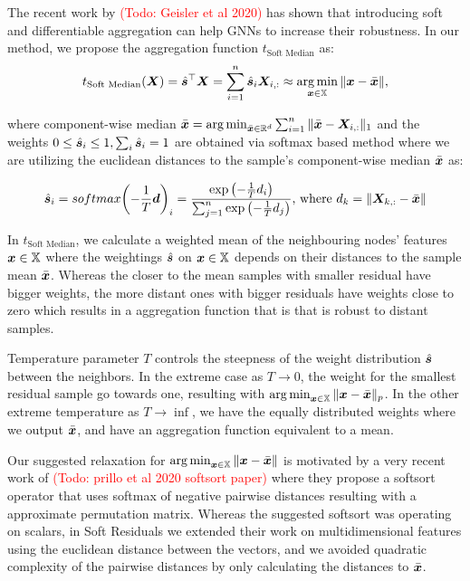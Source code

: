\documentclass{article} %
\newcommand{\features}{\mX}
\newcommand{\featset}{\sX}
\newcommand{\softout}{\vs}
\newcommand{\todo}[1]{\textcolor{red}{(Todo: #1)}}
\begin{document}
The recent work by \todo{Geisler et al 2020} has shown that introducing soft and differentiable aggregation can help GNNs to increase their robustness. In our method, we propose the aggregation function \(t_{\text{Soft Median}}\) as: 
\begin{equation}\label{eq:softmedian}
    t_{\text{Soft Median}}(\features) = \hat{\softout}^\top\features = \sum_{i=1}^n \hat{\softout}_i \features_{i,:} \approx \argmin_{\vx \in \featset} \| \vx - \bar{\vx} \|,  
\end{equation}

where component-wise median \(\bar{\vx} = \argmin_{\bar{\vx} \in \R^d} \sum_{i=1}^n \|\bar{\vx} - \features_{i,:}\|_1 \) and the weights \(0 \leq \hat{\softout}_i \leq 1, \sum_i \hat{\softout}_i = 1\) are obtained via softmax based method where we are utilizing the euclidean distances to the sample's component-wise median $\bar{{\bm{x}}}$ as:

\begin{equation}\label{eq:softmaxdist}
    \hat{\softout}_i
    = softmax{\left(-\frac{1}{T} \vd \right )}_i = \frac{\exp{\left(-\frac{1}{T} \evd_i \right )}}{\sum_{j=1 }^n \exp{\left (-\frac{1}{T} \evd_j \right )}} \text{,~where}~\evd_k = \|\features_{k,:} - \bar{\vx}\|
\end{equation}


 In \(t_{\text{Soft Median}}\), we calculate a weighted mean of the neighbouring nodes' features $\vx \in \featset$ where the weightings $\hat{\softout}$ on $\vx \in \featset$  depends on their distances to the sample mean $\bar{{\bm{x}}}$. Whereas the closer to the mean samples with smaller residual have bigger weights, the more distant ones with bigger residuals have weights close to zero which results in a aggregation function that is that is robust to distant samples.
 
 Temperature parameter $T$ controls the steepness of the weight distribution $\hat{\softout}$ between the neighbors. In the extreme case as $T\to0$, the weight for the smallest residual sample go towards one, resulting with $\argmin_{\vx \in \featset} \| \vx - \bar{\vx} \|_p$. In the other extreme temperature as $T\to\inf$, we have the equally distributed weights where we output $\bar{{\bm{x}}}$, and have an aggregation function equivalent to a mean. 
 
 Our suggested relaxation for $\argmin_{\vx \in \featset} \| \vx - \bar{\vx} \|$ is motivated by a very recent work of \todo{prillo et al 2020 softsort paper} where they propose a softsort operator that uses softmax of negative pairwise distances resulting with a approximate permutation matrix. Whereas the suggested softsort was operating on scalars, in Soft Residuals we extended their work on multidimensional features using the euclidean distance between the vectors, and we avoided quadratic complexity of the pairwise distances by only calculating the distances to $\bar{{\bm{x}}}$.
\end{document}
